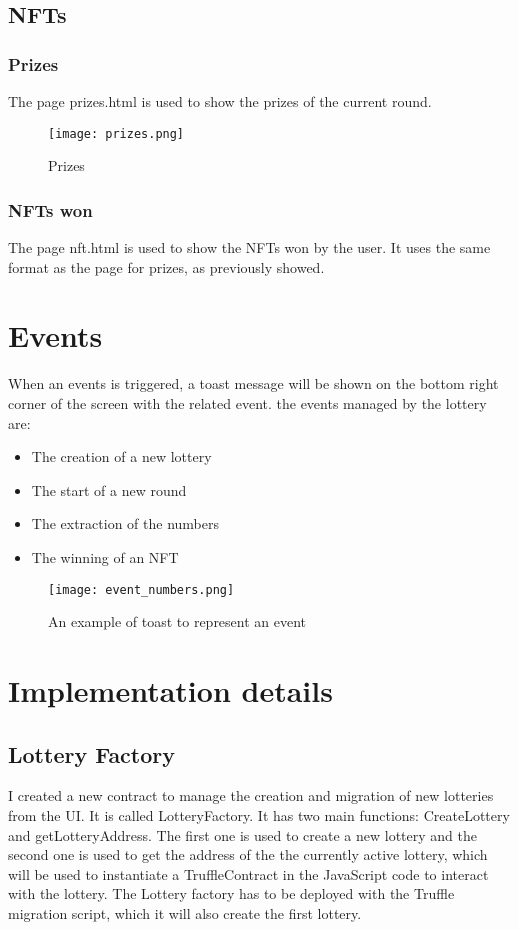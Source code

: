 \documentclass[11pt]{article}
\begin{document}
\subsection{NFTs}
\subsubsection*{Prizes}
The page prizes.html is used to show the prizes of the current round.
\begin{figure}[h!]
\centering
\texttt{[image: prizes.png]}
\caption{Prizes}
\label{fig:prizes}
\end{figure}

\subsubsection*{NFTs won}
The page nft.html is used to show the NFTs won by the user. It uses the
same format as the page for prizes, as previously showed.
\section{Events}
When an events is triggered, a toast message will be shown on the bottom right corner of the screen
with the related event.
the events managed by the lottery are:
\begin{itemize}
\item The creation of a new lottery
\item The start of a new round
\item The extraction of the numbers
\item The winning of an NFT
\end{itemize}
\begin{figure}[h!]
\centering
\texttt{[image: event\_numbers.png]}
\caption{An example of toast to represent an event}
\label{fig:events}

\end{figure}


\section{Implementation details}
\subsection{Lottery Factory}
I created a new contract to manage the creation and migration of new lotteries from the
UI. It is called LotteryFactory. It has two main functions: CreateLottery and getLotteryAddress.
The first one is used to create a new lottery and the second one is used to get the address of the
the currently active lottery, which will be used to instantiate a TruffleContract in the JavaScript
code to interact with the lottery. The Lottery factory has to be deployed with
the Truffle migration script, which it will also create the first lottery.
\end{document}
